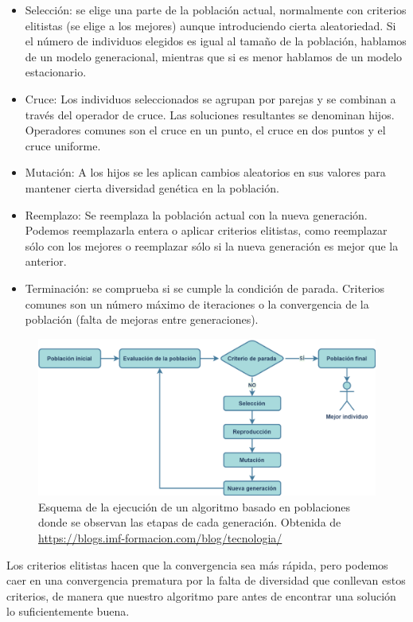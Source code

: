 \begin{itemize}
	\item Selección: se elige una parte de la población actual, normalmente con criterios elitistas (se elige a los mejores) aunque introduciendo cierta aleatoriedad. Si el número de individuos elegidos es igual al tamaño de la población, hablamos de un modelo generacional, mientras que si es menor hablamos de un modelo estacionario. 
	\item Cruce: Los individuos seleccionados se agrupan por parejas y se combinan a través del operador de cruce. Las soluciones resultantes se denominan hijos. Operadores comunes son el cruce en un punto, el cruce en dos puntos y el cruce uniforme. 
	\item Mutación: A los hijos se les aplican cambios aleatorios en sus valores para mantener cierta diversidad genética en la población.
	\item Reemplazo: Se reemplaza la población actual con la nueva generación. Podemos reemplazarla entera o aplicar criterios elitistas, como reemplazar sólo con los mejores o reemplazar sólo si la nueva generación es mejor que la anterior.
	\item Terminación: se comprueba si se cumple la condición de parada. Criterios comunes son un número máximo de iteraciones o la convergencia de la población (falta de mejoras entre generaciones).
\end{itemize}

\begin{figure}
    \centering
    \includegraphics[width=0.75\linewidth]{Plantilla_TFG_latex//imagenes//Inf//2.Fund/alg_gen.png}
    \caption{Esquema de la ejecución de un algoritmo basado en poblaciones donde se observan las etapas de cada generación. Obtenida de \url{https://blogs.imf-formacion.com/blog/tecnologia/}}
    \label{fig:gen_alg}
\end{figure}

Los criterios elitistas hacen que la convergencia sea más rápida, pero podemos caer en una convergencia prematura por la falta de diversidad que conllevan estos criterios, de manera que nuestro algoritmo pare antes de encontrar una solución lo suficientemente buena.



